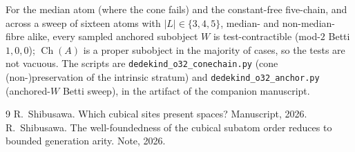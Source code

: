 \documentclass[11pt]{amsart}
\theoremstyle{plain}
\theoremstyle{definition}
\newcommand{\Ch}{\operatorname{Ch}}
\begin{document}
For the median atom (where the cone fails) and the constant-free
five-chain, and across a sweep of sixteen atoms with $|L|\in\{3,4,5\}$,
median- and non-median-fibre alike, every sampled anchored subobject $W$
is test-contractible (mod-$2$ Betti $1,0,0$); $\Ch(A)$ is a proper
subobject in the majority of cases, so the tests are not vacuous.  The
scripts are \texttt{dedekind\_o32\_conechain.py} (cone (non-)preservation
of the intrinsic stratum) and \texttt{dedekind\_o32\_anchor.py}
(anchored-$W$ Betti sweep), in the artifact of the companion manuscript.

\begin{thebibliography}{9}
R.~Shibusawa. Which cubical sites present spaces? Manuscript, 2026.
R.~Shibusawa. The well-foundedness of the cubical subatom order reduces
to bounded generation arity. Note, 2026.
\end{thebibliography}
\end{document}
